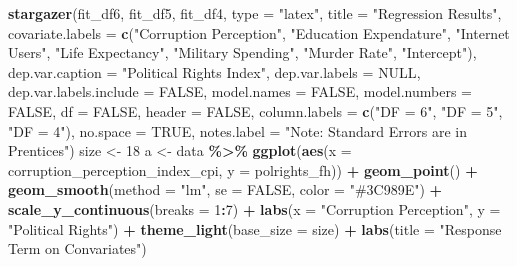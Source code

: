 \documentclass[
  english,
  man,floatsintext]{apa6}
\newenvironment{Shaded}{\begin{snugshade}}{\end{snugshade}}
\newcommand{\DataTypeTok}[1]{\textcolor[rgb]{0.13,0.29,0.53}{#1}}
\newcommand{\DecValTok}[1]{\textcolor[rgb]{0.00,0.00,0.81}{#1}}
\newcommand{\KeywordTok}[1]{\textcolor[rgb]{0.13,0.29,0.53}{\textbf{#1}}}
\newcommand{\NormalTok}[1]{#1}
\newcommand{\OperatorTok}[1]{\textcolor[rgb]{0.81,0.36,0.00}{\textbf{#1}}}
\newcommand{\OtherTok}[1]{\textcolor[rgb]{0.56,0.35,0.01}{#1}}
\newcommand{\StringTok}[1]{\textcolor[rgb]{0.31,0.60,0.02}{#1}}
\begin{document}
\begin{Shaded}
\begin{Highlighting}[]
\KeywordTok{stargazer}\NormalTok{(fit\_df6, fit\_df5, fit\_df4, }
                     \DataTypeTok{type =} \StringTok{"latex"}\NormalTok{, }
                     \DataTypeTok{title =} \StringTok{"Regression Results"}\NormalTok{, }
                     \DataTypeTok{covariate.labels =} \KeywordTok{c}\NormalTok{(}\StringTok{"Corruption Perception"}\NormalTok{, }
                                          \StringTok{"Education Expendature"}\NormalTok{,}
                                          \StringTok{"Internet Users"}\NormalTok{, }
                                          \StringTok{"Life Expectancy"}\NormalTok{,}
                                          \StringTok{"Military Spending"}\NormalTok{, }
                                          \StringTok{"Murder Rate"}\NormalTok{, }
                                          \StringTok{"Intercept"}\NormalTok{),}
                     \DataTypeTok{dep.var.caption =} \StringTok{"Political Rights Index"}\NormalTok{,}
                     \DataTypeTok{dep.var.labels =} \OtherTok{NULL}\NormalTok{,}
                     \DataTypeTok{dep.var.labels.include =} \OtherTok{FALSE}\NormalTok{, }
                     \DataTypeTok{model.names =} \OtherTok{FALSE}\NormalTok{,}
                     \DataTypeTok{model.numbers =} \OtherTok{FALSE}\NormalTok{,}
                     \DataTypeTok{df =} \OtherTok{FALSE}\NormalTok{, }
                     \DataTypeTok{header =} \OtherTok{FALSE}\NormalTok{,}
                     \DataTypeTok{column.labels =} \KeywordTok{c}\NormalTok{(}\StringTok{"DF = 6"}\NormalTok{, }\StringTok{"DF = 5"}\NormalTok{, }\StringTok{"DF = 4"}\NormalTok{),}
                     \DataTypeTok{no.space =} \OtherTok{TRUE}\NormalTok{, }
                     \DataTypeTok{notes.label =} \StringTok{"Note: Standard Errors are in Prentices"}\NormalTok{)}
\NormalTok{size \textless{}{-}}\StringTok{ }\DecValTok{18}
\NormalTok{a \textless{}{-}}\StringTok{ }\NormalTok{data }\OperatorTok{\%\textgreater{}\%}\StringTok{ }
\StringTok{  }\KeywordTok{ggplot}\NormalTok{(}\KeywordTok{aes}\NormalTok{(}\DataTypeTok{x =}\NormalTok{ corruption\_perception\_index\_cpi, }\DataTypeTok{y =}\NormalTok{ polrights\_fh)) }\OperatorTok{+}\StringTok{ }
\StringTok{  }\KeywordTok{geom\_point}\NormalTok{() }\OperatorTok{+}\StringTok{ }
\StringTok{  }\KeywordTok{geom\_smooth}\NormalTok{(}\DataTypeTok{method =} \StringTok{"lm"}\NormalTok{, }\DataTypeTok{se =} \OtherTok{FALSE}\NormalTok{, }\DataTypeTok{color =} \StringTok{"\#3C989E"}\NormalTok{) }\OperatorTok{+}\StringTok{ }
\StringTok{  }\KeywordTok{scale\_y\_continuous}\NormalTok{(}\DataTypeTok{breaks =} \DecValTok{1}\OperatorTok{:}\DecValTok{7}\NormalTok{) }\OperatorTok{+}\StringTok{ }
\StringTok{  }\KeywordTok{labs}\NormalTok{(}\DataTypeTok{x =} \StringTok{"Corruption Perception"}\NormalTok{, }\DataTypeTok{y =} \StringTok{"Political Rights"}\NormalTok{) }\OperatorTok{+}
\StringTok{  }\KeywordTok{theme\_light}\NormalTok{(}\DataTypeTok{base\_size =}\NormalTok{ size) }\OperatorTok{+}\StringTok{ }\KeywordTok{labs}\NormalTok{(}\DataTypeTok{title =} \StringTok{"Response Term on Convariates"}\NormalTok{)}


\end{Highlighting}
\end{Shaded}
\end{document}

